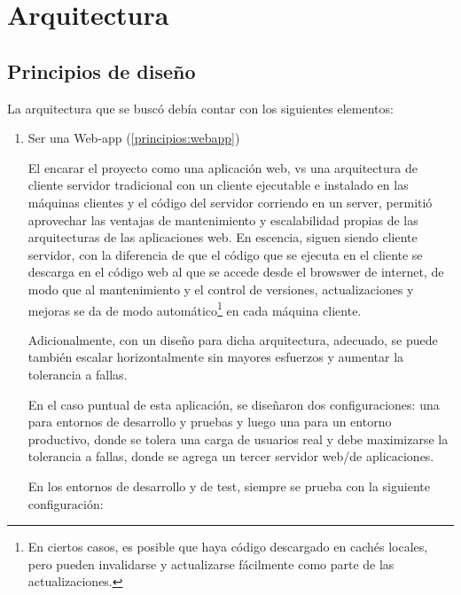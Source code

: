 \chapter{Arquitectura}
\section{Principios de diseño}

La arquitectura que se buscó debía contar con los siguientes elementos: 

\begin{enumerate}
    \item Ser una Web-app (\ref{principios:webapp}) \label{arq:webapp}

El encarar el proyecto como una aplicación web, vs una arquitectura de cliente servidor tradicional con un cliente ejecutable e instalado en las máquinas clientes y el código del servidor corriendo en un server, permitió aprovechar las ventajas de mantenimiento y escalabilidad propias de las arquitecturas de las aplicaciones web. En escencia, siguen siendo cliente servidor, con la diferencia de que el código que se ejecuta en el cliente se descarga en el código web al que se accede desde el browswer de internet, de modo que al mantenimiento y el control de versiones, actualizaciones y mejoras se da de modo automático\footnote{En ciertos casos, es posible que haya código descargado en cachés locales, pero pueden invalidarse y actualizarse fácilmente como parte de las actualizaciones.} en cada máquina cliente.

Adicionalmente, con un diseño para dicha arquitectura, adecuado, se puede también escalar horizontalmente sin mayores esfuerzos y aumentar la tolerancia a fallas.

En el caso puntual de esta aplicación, se diseñaron dos configuraciones: una para entornos de desarrollo y pruebas y luego una para un entorno productivo, donde se tolera una carga de usuarios real y debe maximizarse la tolerancia a fallas, donde se agrega un tercer servidor web/de aplicaciones.

En los entornos de desarrollo y de test, siempre se prueba con la siguiente configuración:

\begin{figure}
    \centering
\end{figure}
\end{enumerate}
